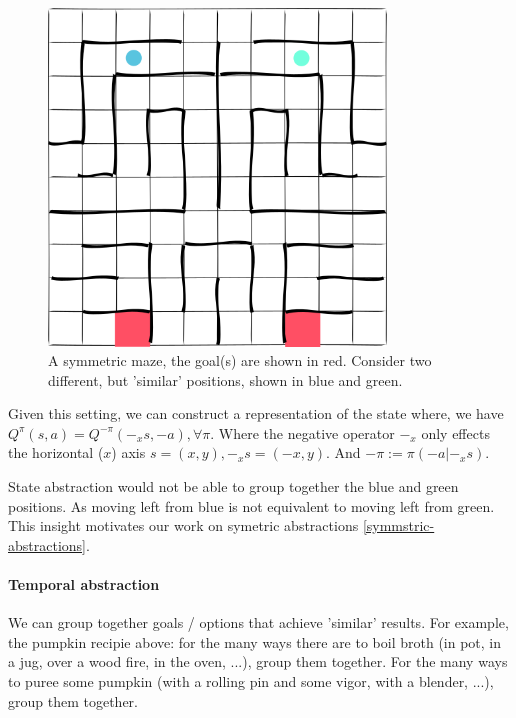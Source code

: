 \begin{figure}[h!]
\centering
\includegraphics[width=0.8\textwidth,height=0.4\textheight]{../../pictures/drawings/maze.png}
\caption{A symmetric maze, the goal(s) are shown in red.
Consider two different, but 'similar' positions, shown in blue and green.}
\end{figure}

Given this setting, we can construct a representation of the state \footnotemark[11] where,
we have $Q^{\pi}(s, a) = Q^{-\pi}(-_xs, -a), \forall \pi$.
Where the negative operator $-_x$ only effects the horizontal ($x$) axis $s = (x, y), -_xs = (-x, y)$.
And $-\pi := \pi(-a|-_xs)$.


State abstraction would not be able to group together the blue and green positions.
As moving left from blue is not equivalent to moving left from green.
This insight motivates our work on symetric abstractions \ref{symmstric-abstractions}.

\paragraph{Temporal abstraction}

We can group together goals / options that achieve 'similar' results.
For example, the pumpkin recipie above: for the many ways there are to boil broth
(in pot, in a jug, over a wood fire, in the oven, ...), group them together.
For the many ways to puree some pumpkin (with a rolling pin and some vigor, with a blender, ...), group them together.

